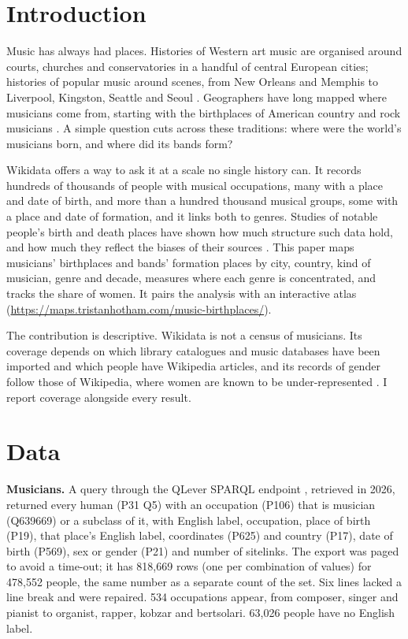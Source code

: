 \documentclass[11pt,a4paper]{article}
\begin{document}
\section{Introduction}
Music has always had places. Histories of Western art music are organised around courts, churches and conservatories in a handful of central European cities; histories of popular music around scenes, from New Orleans and Memphis to Liverpool, Kingston, Seattle and Seoul \citep{connell, bennett}. Geographers have long mapped where musicians come from, starting with the birthplaces of American country and rock musicians \citep{carney}. A simple question cuts across these traditions: where were the world's musicians born, and where did its bands form?

Wikidata \citep{wikidata} offers a way to ask it at a scale no single history can. It records hundreds of thousands of people with musical occupations, many with a place and date of birth, and more than a hundred thousand musical groups, some with a place and date of formation, and it links both to genres. Studies of notable people's birth and death places have shown how much structure such data hold, and how much they reflect the biases of their sources \citep{schich}. This paper maps musicians' birthplaces and bands' formation places by city, country, kind of musician, genre and decade, measures where each genre is concentrated, and tracks the share of women. It pairs the analysis with an interactive atlas (\url{https://maps.tristanhotham.com/music-birthplaces/}).

The contribution is descriptive. Wikidata is not a census of musicians. Its coverage depends on which library catalogues and music databases have been imported and which people have Wikipedia articles, and its records of gender follow those of Wikipedia, where women are known to be under-represented \citep{wagner}. I report coverage alongside every result.

\section{Data}
\textbf{Musicians.} A query through the QLever SPARQL endpoint \citep{qlever}, retrieved in 2026, returned every human (P31 Q5) with an occupation (P106) that is musician (Q639669) or a subclass of it, with English label, occupation, place of birth (P19), that place's English label, coordinates (P625) and country (P17), date of birth (P569), sex or gender (P21) and number of sitelinks. The export was paged to avoid a time-out; it has 818,669 rows (one per combination of values) for 478,552 people, the same number as a separate count of the set. Six lines lacked a line break and were repaired. 534 occupations appear, from composer, singer and pianist to organist, rapper, kobzar and bertsolari. 63,026 people have no English label.
\end{document}
